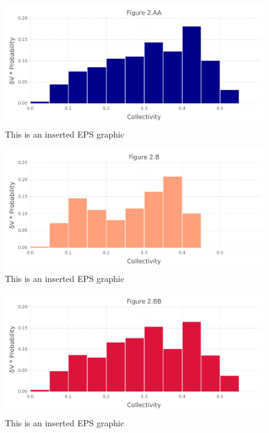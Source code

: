 \documentclass[10pt,letterpaper]{article}
\begin{document}
\begin{figure}[ht]
\begin{center}
\includegraphics[scale=0.5]{1prn/2aafigure_hi-precision.pdf}
\caption{This is an inserted EPS graphic}
\label{fig4}
\end{center}
\end{figure}

\begin{figure}[ht]
\begin{center}
\includegraphics[scale=0.5]{1prn/2bfigure_hi-precision.pdf}
\caption{This is an inserted EPS graphic}
\label{fig5}
\end{center}
\end{figure}

\begin{figure}[ht]
\begin{center}
\includegraphics[scale=0.5]{1prn/2bbfigure_hi-precision.pdf}
\caption{This is an inserted EPS graphic}
\label{fig6}
\end{center}
\end{figure}
\end{document}
